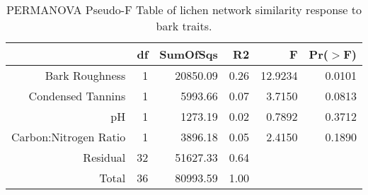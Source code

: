 \begin{table}[ht]
\centering
\begin{tabular}{rrrrrr}
  \hline
 & df & SumOfSqs & R2 & F & Pr($>$F) \\ 
  \hline
Bark Roughness & 1 & 20850.09 & 0.26 & 12.9234 & 0.0101 \\ 
  Condensed Tannins & 1 & 5993.66 & 0.07 & 3.7150 & 0.0813 \\ 
  pH & 1 & 1273.19 & 0.02 & 0.7892 & 0.3712 \\ 
  Carbon:Nitrogen Ratio & 1 & 3896.18 & 0.05 & 2.4150 & 0.1890 \\ 
  Residual & 32 & 51627.33 & 0.64 &  &  \\ 
  Total & 36 & 80993.59 & 1.00 &  &  \\ 
   \hline
\end{tabular}
\caption{PERMANOVA Pseudo-F Table of lichen network similarity response to bark traits.} 
\label{tab:cn_trait_perm}
\end{table}
